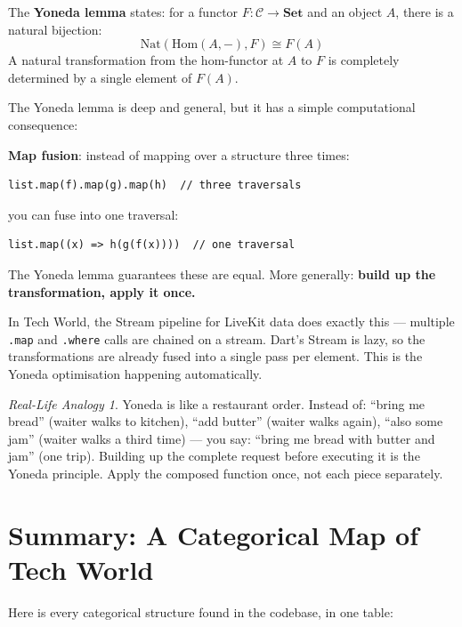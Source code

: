 \documentclass[12pt,a4paper]{article}
\theoremstyle{definition}
\theoremstyle{plain}
\theoremstyle{remark}
\newtheorem*{reallife}{Real-Life Analogy}
\begin{document}
\begin{formal}
The \textbf{Yoneda lemma} states: for a functor $F \colon \mathcal{C} \to \mathbf{Set}$
and an object $A$, there is a natural bijection:
\[
\mathrm{Nat}(\mathrm{Hom}(A, -), F) \cong F(A)
\]
A natural transformation from the hom-functor at $A$ to $F$ is completely
determined by a single element of $F(A)$.
\end{formal}

The Yoneda lemma is deep and general, but it has a simple computational
consequence:

\begin{youknow}
\textbf{Map fusion}: instead of mapping over a structure three times:
\begin{lstlisting}
list.map(f).map(g).map(h)  // three traversals
\end{lstlisting}
you can fuse into one traversal:
\begin{lstlisting}
list.map((x) => h(g(f(x))))  // one traversal
\end{lstlisting}
The Yoneda lemma guarantees these are equal.
More generally: \textbf{build up the transformation, apply it once.}
\end{youknow}

In Tech World, the Stream pipeline for LiveKit data does exactly this ---
multiple \texttt{.map} and \texttt{.where} calls are chained on a stream.
Dart's Stream is lazy, so the transformations are already fused into a single
pass per element. This is the Yoneda optimisation happening automatically.

\begin{reallife}
Yoneda is like a restaurant order.
Instead of: ``bring me bread'' (waiter walks to kitchen),
``add butter'' (waiter walks again),
``also some jam'' (waiter walks a third time) ---
you say: ``bring me bread with butter and jam'' (one trip).
Building up the complete request before executing it is the Yoneda
principle. Apply the composed function once, not each piece separately.
\end{reallife}


\section{Summary: A Categorical Map of Tech World}
\label{sec:summary}

Here is every categorical structure found in the codebase, in one table:
\end{document}
